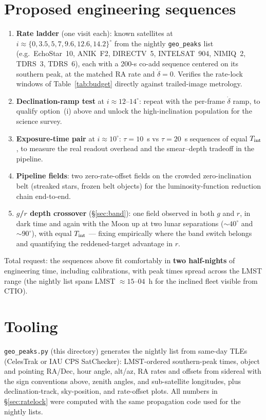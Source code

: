 \documentclass[11pt]{article}
\begin{document}
\section{Proposed engineering sequences}

\begin{enumerate}
  \item \textbf{Rate ladder} (one visit each): known satellites at
        $i \approx \{0, 3.5, 5, 7, 9.6, 12.6, 14.2\}^{\circ}$ from the nightly
        \texttt{geo\_peaks} list (e.g.\ EchoStar~10, ANIK~F2, DIRECTV~5, INTELSAT~904,
        NIMIQ~2, TDRS~3, TDRS~6), each with a 200-s co-add sequence centered on its
        southern peak, at the matched RA rate and $\dot\delta=0$. Verifies the
        rate-lock windows of Table~\ref{tab:budget} directly against trailed-image
        metrology.
  \item \textbf{Declination-ramp test} at $i\approx12$--$14^{\circ}$: repeat with the
        per-frame $\dot\delta$ ramp, to qualify option~(i) above and unlock the
        high-inclination population for the science survey.
  \item \textbf{Exposure-time pair} at $i\approx10^{\circ}$: $\tau=10$~s vs $\tau=20$~s
        sequences of equal $T_{\rm int}$, to measure the real readout overhead and the
        smear--depth tradeoff in the pipeline.
  \item \textbf{Pipeline fields}: two zero-rate-offset fields on the crowded
        zero-inclination belt (streaked stars, frozen belt objects) for the
        luminosity-function reduction chain end-to-end.
  \item \textbf{$g$/$r$ depth crossover} (\S\ref{sec:band}): one field observed in both
        $g$ and $r$, in dark time and again with the Moon up at two lunar separations
        ($\sim40^{\circ}$ and $\sim90^{\circ}$), with equal $T_{\rm int}$ --- fixing
        empirically where the band switch belongs and quantifying the reddened-target
        advantage in $r$.
\end{enumerate}

Total request: the sequences above fit comfortably in \textbf{two half-nights} of
engineering time, including calibrations, with peak times spread across the LMST range
(the nightly list spans LMST $\approx 15$--$04$~h for the inclined fleet visible from
CTIO).

\section*{Tooling}

\texttt{geo\_peaks.py} (this directory) generates the nightly list from same-day TLEs
(CelesTrak or IAU CPS SatChecker): LMST-ordered southern-peak times, object and pointing
RA/Dec, hour angle, alt/az, RA rates and offsets from sidereal with the sign conventions
above, zenith angles, and sub-satellite longitudes, plus declination-track,
sky-position, and rate-offset plots. All numbers in \S\ref{sec:ratelock} were computed
with the same propagation code used for the nightly lists.
\end{document}
